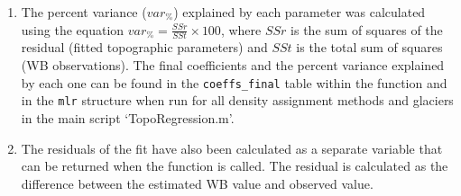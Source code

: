 \documentclass{sfuthesis}
\begin{document}
{\begin{appendices}
\begin{enumerate}
\item The percent variance ($var_\%$) explained by each parameter was calculated using the equation $var_\% = \frac{SSr}{SSt}\times 100$, where $SSr$ is the sum of squares of the residual (fitted topographic parameters) and $SSt$ is the total sum of squares (WB observations). The final coefficients and the percent variance explained by each one can be found in the \texttt{coeffs\_final} table within the function and in the \texttt{mlr} structure when run for all density assignment methods and glaciers in the main script `TopoRegression.m'.

\item The residuals of the fit have also been calculated as a separate variable that can be returned when the function is called. The residual is calculated as the difference between the estimated WB value and observed value. 
\end{enumerate}
	
	

\end{appendices}}
\end{document}
